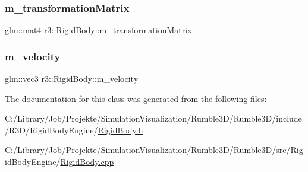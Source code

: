 \subsubsection{\texorpdfstring{m\+\_\+transformation\+Matrix}{m\_transformationMatrix}}
{\footnotesize\ttfamily glm\+::mat4 r3\+::\+Rigid\+Body\+::m\+\_\+transformation\+Matrix\hspace{0.3cm}{\ttfamily [protected]}}

\mbox{\label{classr3_1_1_rigid_body_a2de7cddcf262009fc8261688d1e56c49}} 
\subsubsection{\texorpdfstring{m\+\_\+velocity}{m\_velocity}}
{\footnotesize\ttfamily glm\+::vec3 r3\+::\+Rigid\+Body\+::m\+\_\+velocity\hspace{0.3cm}{\ttfamily [protected]}}



The documentation for this class was generated from the following files\+:\begin{DoxyCompactItemize}
\item 
C\+:/\+Library/\+Job/\+Projekte/\+Simulation\+Visualization/\+Rumble3\+D/\+Rumble3\+D/include/\+R3\+D/\+Rigid\+Body\+Engine/\mbox{\hyperlink{_rigid_body_8h}{Rigid\+Body.\+h}}\item 
C\+:/\+Library/\+Job/\+Projekte/\+Simulation\+Visualization/\+Rumble3\+D/\+Rumble3\+D/src/\+Rigid\+Body\+Engine/\mbox{\hyperlink{_rigid_body_8cpp}{Rigid\+Body.\+cpp}}\end{DoxyCompactItemize}
